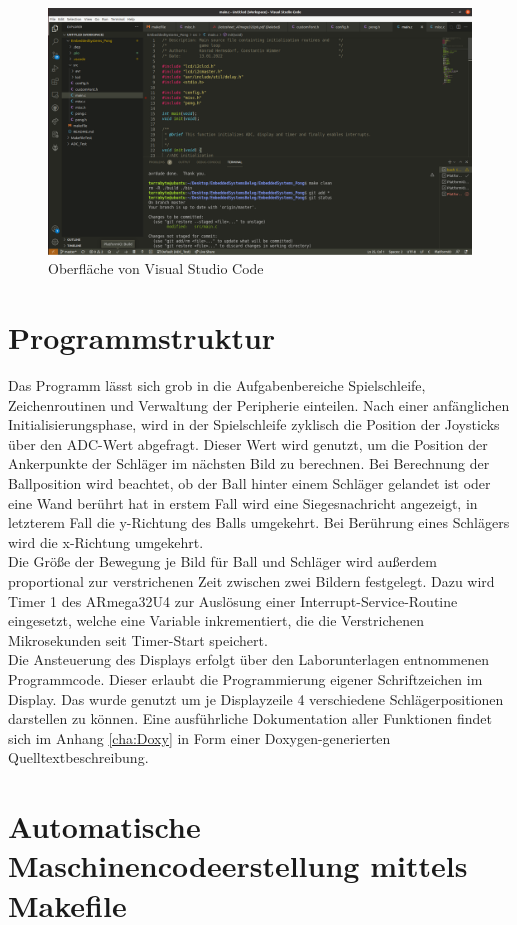 \begin{figure}[H]
\includegraphics[width=\textwidth]{./Bilder/Code.png}
\caption{Oberfläche von Visual Studio Code}
\end{figure}


\section{Programmstruktur}
\label{sec:Prog}
Das Programm lässt sich grob in die Aufgabenbereiche Spielschleife, Zeichenroutinen und Verwaltung der Peripherie einteilen. Nach einer anfänglichen Initialisierungsphase, wird in der Spielschleife zyklisch die Position der Joysticks über den ADC-Wert abgefragt. Dieser Wert wird genutzt, um die Position der Ankerpunkte der Schläger im nächsten Bild zu berechnen. Bei Berechnung der Ballposition wird beachtet, ob der Ball hinter einem Schläger gelandet ist oder eine Wand berührt hat in erstem Fall wird eine Siegesnachricht angezeigt, in letzterem Fall die y-Richtung des Balls umgekehrt. Bei Berührung eines Schlägers wird die x-Richtung umgekehrt.\\
Die Größe der Bewegung je Bild für Ball und Schläger wird außerdem proportional zur verstrichenen Zeit zwischen zwei Bildern festgelegt. Dazu wird Timer 1 des ARmega32U4 zur Auslösung einer Interrupt-Service-Routine eingesetzt, welche eine Variable inkrementiert, die die Verstrichenen Mikrosekunden seit Timer-Start speichert.\\
Die Ansteuerung des Displays erfolgt über den Laborunterlagen entnommenen Programmcode. Dieser erlaubt die Programmierung eigener Schriftzeichen im Display. Das wurde genutzt um je Displayzeile 4 verschiedene Schlägerpositionen darstellen zu können.
Eine ausführliche Dokumentation aller Funktionen findet sich im Anhang \ref{cha:Doxy} in Form einer Doxygen-generierten Quelltextbeschreibung.

\section{Automatische Maschinencodeerstellung mittels Makefile}
\label{sec:Make}


 

